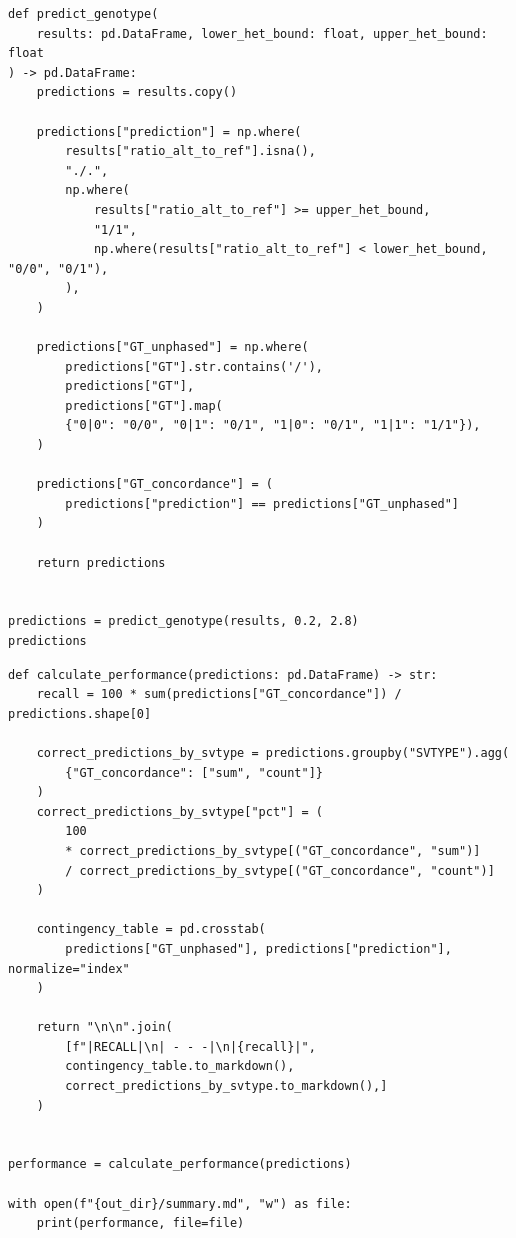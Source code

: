 \documentclass{article}
\begin{document}
\begin{verbatim}
def predict_genotype(
    results: pd.DataFrame, lower_het_bound: float, upper_het_bound: float
) -> pd.DataFrame:
    predictions = results.copy()

    predictions["prediction"] = np.where(
        results["ratio_alt_to_ref"].isna(),
        "./.",
        np.where(
            results["ratio_alt_to_ref"] >= upper_het_bound,
            "1/1",
            np.where(results["ratio_alt_to_ref"] < lower_het_bound, "0/0", "0/1"),
        ),
    )

    predictions["GT_unphased"] = np.where(
        predictions["GT"].str.contains('/'),
        predictions["GT"],
        predictions["GT"].map(
        {"0|0": "0/0", "0|1": "0/1", "1|0": "0/1", "1|1": "1/1"}),
    )

    predictions["GT_concordance"] = (
        predictions["prediction"] == predictions["GT_unphased"]
    )

    return predictions


predictions = predict_genotype(results, 0.2, 2.8)
predictions
\end{verbatim}

\begin{verbatim}
def calculate_performance(predictions: pd.DataFrame) -> str:
    recall = 100 * sum(predictions["GT_concordance"]) / predictions.shape[0]

    correct_predictions_by_svtype = predictions.groupby("SVTYPE").agg(
        {"GT_concordance": ["sum", "count"]}
    )
    correct_predictions_by_svtype["pct"] = (
        100
        * correct_predictions_by_svtype[("GT_concordance", "sum")]
        / correct_predictions_by_svtype[("GT_concordance", "count")]
    )

    contingency_table = pd.crosstab(
        predictions["GT_unphased"], predictions["prediction"], normalize="index"
    )

    return "\n\n".join(
        [f"|RECALL|\n| - - -|\n|{recall}|",
        contingency_table.to_markdown(),
        correct_predictions_by_svtype.to_markdown(),]
    )


performance = calculate_performance(predictions)

with open(f"{out_dir}/summary.md", "w") as file:
    print(performance, file=file)
\end{verbatim}

\clearpage

\end{document}
